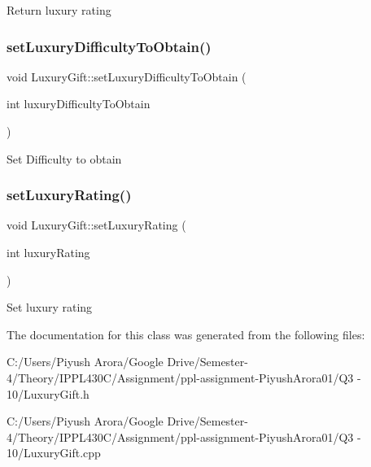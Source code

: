 Return luxury rating \mbox{\label{class_luxury_gift_ab7897f54cd7a896dad198107e92fb8ca}} 
\subsubsection{\texorpdfstring{set\+Luxury\+Difficulty\+To\+Obtain()}{setLuxuryDifficultyToObtain()}}
{\footnotesize\ttfamily void Luxury\+Gift\+::set\+Luxury\+Difficulty\+To\+Obtain (\begin{DoxyParamCaption}\item[{int}]{luxury\+Difficulty\+To\+Obtain }\end{DoxyParamCaption})}

Set Difficulty to obtain \mbox{\label{class_luxury_gift_a3a2f57732502c45b2e5bcab6963d4de7}} 
\subsubsection{\texorpdfstring{set\+Luxury\+Rating()}{setLuxuryRating()}}
{\footnotesize\ttfamily void Luxury\+Gift\+::set\+Luxury\+Rating (\begin{DoxyParamCaption}\item[{int}]{luxury\+Rating }\end{DoxyParamCaption})}

Set luxury rating 

The documentation for this class was generated from the following files\+:\begin{DoxyCompactItemize}
\item 
C\+:/\+Users/\+Piyush Arora/\+Google Drive/\+Semester-\/4/\+Theory/\+I\+P\+P\+L430\+C/\+Assignment/ppl-\/assignment-\/\+Piyush\+Arora01/\+Q3 -\/ 10/Luxury\+Gift.\+h\item 
C\+:/\+Users/\+Piyush Arora/\+Google Drive/\+Semester-\/4/\+Theory/\+I\+P\+P\+L430\+C/\+Assignment/ppl-\/assignment-\/\+Piyush\+Arora01/\+Q3 -\/ 10/Luxury\+Gift.\+cpp\end{DoxyCompactItemize}
